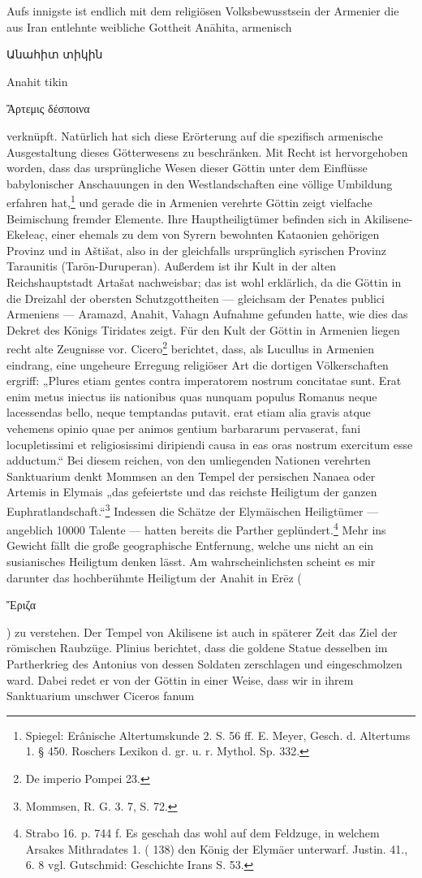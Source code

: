 \documentclass{article}
\begin{document}
Aufs innigste ist endlich mit dem religiösen Volksbewusstsein der Armenier die aus Iran entlehnte weibliche Gottheit Anāhita, armenisch \begin{armenian}Անահիտ տիկին\end{armenian} Anahit tikin \begin{greek}Ἄρτεμις δέσποινα\end{greek} verknüpft. Natürlich hat sich diese Erörterung auf die spezifisch armenische Ausgestaltung dieses Götterwesens zu beschränken. Mit Recht ist hervorgehoben worden, dass das ursprüngliche Wesen dieser Göttin unter dem Einflüsse babylonischer Anschauungen in den Westlandschaften eine völlige Umbildung erfahren hat,\footnote{Spiegel: Erânische Altertumskunde 2. S. 56 ff. E. Meyer, Gesch. d. Altertums 1. § 450. Roschers Lexikon d. gr. u. r. Mythol. Sp. 332.} und gerade die in Armenien verehrte Göttin zeigt vielfache Beimischung fremder Elemente. Ihre Hauptheiligtümer befinden sich in Akilisene-Ekełeac̣, einer ehemals zu dem von Syrern bewohnten Kataonien gehörigen Provinz und in Aštišat, also in der gleichfalls ursprünglich syrischen Provinz Taraunitis (Tarōn-Duruperan). Außerdem ist ihr Kult in der alten Reichshauptstadt Artašat nachweisbar; das ist wohl erklärlich, da die Göttin in die Dreizahl der obersten Schutzgottheiten — gleichsam der Penates publici Armeniens — Aramazd, Anahit, Vahagn Aufnahme gefunden hatte, wie dies das Dekret des Königs Tiridates zeigt. Für den Kult der Göttin in Armenien liegen recht alte Zeugnisse vor. Cicero\footnote{De imperio Pompei 23.} berichtet, dass, als Lucullus in Armenien eindrang, eine ungeheure Erregung religiöser Art die dortigen Völkerschaften ergriff: „Plures etiam gentes contra imperatorem nostrum concitatae sunt. Erat enim metus iniectus iis nationibus quas nunquam populus Romanus neque lacessendas bello, neque temptandas putavit. erat etiam alia gravis atque vehemens opinio quae per animos gentium barbararum pervaserat, fani locupletissimi et religiosissimi diripiendi causa in eas oras nostrum exercitum esse adductum.“ Bei diesem reichen, von den umliegenden Nationen verehrten Sanktuarium denkt Mommsen an den Tempel der persischen Nanaea oder Artemis in Elymais „das gefeiertste und das reichste Heiligtum der ganzen Euphratlandschaft.“\footnote{Mommsen, R. G. 3. 7, S. 72.} Indessen die Schätze der Elymäischen Heiligtümer — angeblich 10000 Talente — hatten bereits die Parther geplündert.\footnote{Strabo 16. p. 744 f. Es geschah das wohl auf dem Feldzuge, in welchem Arsakes Mithradates 1. ( 138) den König der Elymäer unterwarf. Justin. 41., 6. 8 vgl. Gutschmid: Geschichte Irans S. 53.} Mehr ins Gewicht fällt die große geographische Entfernung, welche uns nicht an ein susianisches Heiligtum denken lässt. Am wahrscheinlichsten scheint es mir darunter das hochberühmte Heiligtum der Anahit in Erēz (\begin{greek}Ἔριζα\end{greek}) zu verstehen. Der Tempel von Akilisene ist auch in späterer Zeit das Ziel der römischen Raubzüge. Plinius berichtet, dass die goldene Statue desselben im Partherkrieg des Antonius von dessen Soldaten zerschlagen und eingeschmolzen ward. Dabei redet er von der Göttin in einer Weise, dass wir in ihrem Sanktuarium unschwer Ciceros fanum 
\end{document}
